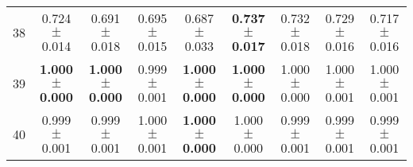 \begin{table}[!ht]
{\begin{tabular}{r c c c c c c c c}
38 & 0.724 $\pm$ 0.014 & 0.691 $\pm$ 0.018 & 0.695 $\pm$ 0.015 & 0.687 $\pm$ 0.033 & \textbf{0.737 $\pm$ 0.017} & 0.732 $\pm$ 0.018 & 0.729 $\pm$ 0.016 & 0.717 $\pm$ 0.016 \\
39 & \textbf{1.000 $\pm$ 0.000} & \textbf{1.000 $\pm$ 0.000} & 0.999 $\pm$ 0.001 & \textbf{1.000 $\pm$ 0.000} & \textbf{1.000 $\pm$ 0.000} & 1.000 $\pm$ 0.000 & 1.000 $\pm$ 0.001 & 1.000 $\pm$ 0.001 \\
40 & 0.999 $\pm$ 0.001 & 0.999 $\pm$ 0.001 & 1.000 $\pm$ 0.001 & \textbf{1.000 $\pm$ 0.000} & 1.000 $\pm$ 0.000 & 0.999 $\pm$ 0.001 & 0.999 $\pm$ 0.001 & 0.999 $\pm$ 0.001 \\
\end{tabular}}
\end{table}
